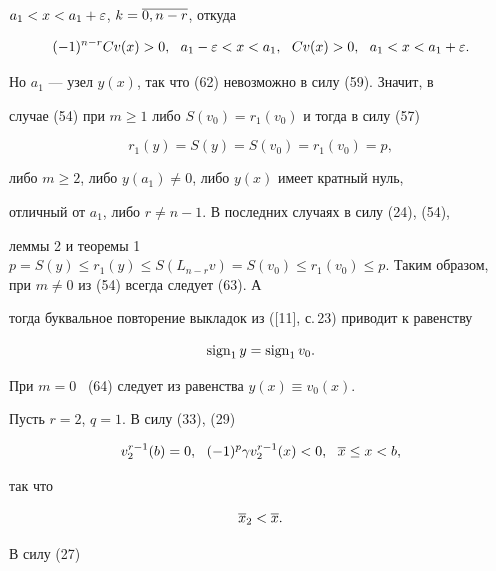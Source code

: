 \begin{pf}
$a_1<x<a_1+\varepsilon$, $k=\overline{0,n-r}$, откуда


\begin{equation}


(-1)^{n-r}Cv(x)>0,\ \ a_1-\eps<x<a_1,\ \ Cv(x)>0,\ \ a_1<x<a_1+\eps.


\end{equation}


Но $a_1$ --- узел $y(x)$, так что  (62) невозможно в силу (59). Значит, в


случае (54) при $m\ge 1$ либо $S(v_0)=r_1(v_0)$ и тогда в силу (57)


\begin{equation}


r_1(y)=S(y)=S(v_0)=r_1(v_0)=p,


\end{equation}


либо $m\ge 2$, либо $y(a_1)\ne 0$, либо $y(x)$ имеет кратный нуль,


отличный от $a_1$, либо $r\ne n-1$. В последних случаях в силу (24), (54),


леммы 2 и теоремы 1 \ $p=S(y)\le r_1(y)\le S(L_{n-r}v)=S(v_0)\le


r_1(v_0)\le p$. Таким образом, при $m\ne 0$ из (54) всегда следует (63). А 


тогда буквальное повторение выкладок из ([11], с.\,23) приводит к равенству


\begin{equation}


\sign_1y=\sign_1v_0.


\end{equation}


При $m=0$ \ (64) следует из равенства $y(x)\equiv v_0(x)$.





Пусть $r=2$, $q=1$. В силу (33), (29)


\begin{equation}


v^{r-1}_2(b)=0,\ \ (-1)^p\gamma v_2^{r-1}(x)<0,\ \ \o{x}\le x<b,


\end{equation}


так что


\begin{equation}


\o{x}_2<\o{x}.


\end{equation}


В силу (27)



\end{pf}
